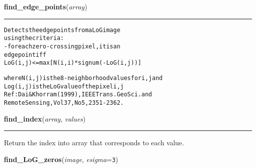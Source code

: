     \begin{boxedminipage}{\textwidth}

    \raggedright \textbf{find\_edge\_points}(\textit{array})

    \vspace{-1.5ex}

    \rule{\textwidth}{0.5\fboxrule}
\begin{alltt}
Detects the edge points from a LoG image
using the criteria:
- for each zero-crossing pixel, it is an
edge point iff
LoG(i,j) {\textless}= max[N(i,i)*signum(-LoG(i,j))]

where N(i,j) is the 8-neighborhood values for i,j and
      Log(i,j) is the LoG value of the pixel i,j
Ref: Dai \& Khorram (1999), IEEE Trans. GeoSci. and
     Remote Sensing, Vol 37, No 5, 2351-2362.\end{alltt}

    \vspace{1ex}

    \end{boxedminipage}

    \label{multireg:edge_detect:find_index}
    \vspace{0.5ex}

    \begin{boxedminipage}{\textwidth}

    \raggedright \textbf{find\_index}(\textit{array}, \textit{values})

    \vspace{-1.5ex}

    \rule{\textwidth}{0.5\fboxrule}
    Return the index into array that corresponds to each value.

    \vspace{1ex}

    \end{boxedminipage}

    \label{multireg:edge_detect:find_LoG_zeros}
    \vspace{0.5ex}

    \begin{boxedminipage}{\textwidth}

    \raggedright \textbf{find\_LoG\_zeros}(\textit{image}, \textit{esigma}=\texttt{3\-})

    \end{boxedminipage}

